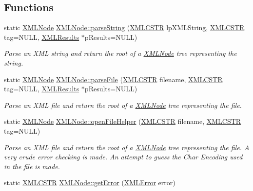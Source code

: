 \subsection*{Functions}
\begin{DoxyCompactItemize}
\item 
static \hyperlink{structXMLNode}{X\-M\-L\-Node} \hyperlink{group__conversions_ga72125a4ccfae9b39bafab768346bbc7e}{X\-M\-L\-Node\-::parse\-String} (\hyperlink{xmlParser_8h_acdb0d6fd8dd596384b438d86cfb2b182}{X\-M\-L\-C\-S\-T\-R} lp\-X\-M\-L\-String, \hyperlink{xmlParser_8h_acdb0d6fd8dd596384b438d86cfb2b182}{X\-M\-L\-C\-S\-T\-R} tag=N\-U\-L\-L, \hyperlink{structXMLResults}{X\-M\-L\-Results} $\ast$p\-Results=N\-U\-L\-L)
\begin{DoxyCompactList}\small\item\em Parse an X\-M\-L string and return the root of a \hyperlink{structXMLNode}{X\-M\-L\-Node} tree representing the string. \end{DoxyCompactList}\item 
static \hyperlink{structXMLNode}{X\-M\-L\-Node} \hyperlink{group__conversions_gae984d7ebce97fad429b2b786439815fb}{X\-M\-L\-Node\-::parse\-File} (\hyperlink{xmlParser_8h_acdb0d6fd8dd596384b438d86cfb2b182}{X\-M\-L\-C\-S\-T\-R} filename, \hyperlink{xmlParser_8h_acdb0d6fd8dd596384b438d86cfb2b182}{X\-M\-L\-C\-S\-T\-R} tag=N\-U\-L\-L, \hyperlink{structXMLResults}{X\-M\-L\-Results} $\ast$p\-Results=N\-U\-L\-L)
\begin{DoxyCompactList}\small\item\em Parse an X\-M\-L file and return the root of a \hyperlink{structXMLNode}{X\-M\-L\-Node} tree representing the file. \end{DoxyCompactList}\item 
static \hyperlink{structXMLNode}{X\-M\-L\-Node} \hyperlink{group__conversions_ga46f99cf406604471e15d4378f74ecc63}{X\-M\-L\-Node\-::open\-File\-Helper} (\hyperlink{xmlParser_8h_acdb0d6fd8dd596384b438d86cfb2b182}{X\-M\-L\-C\-S\-T\-R} filename, \hyperlink{xmlParser_8h_acdb0d6fd8dd596384b438d86cfb2b182}{X\-M\-L\-C\-S\-T\-R} tag=N\-U\-L\-L)
\begin{DoxyCompactList}\small\item\em Parse an X\-M\-L file and return the root of a \hyperlink{structXMLNode}{X\-M\-L\-Node} tree representing the file. A very crude error checking is made. An attempt to guess the Char Encoding used in the file is made. \end{DoxyCompactList}\item 
static \hyperlink{xmlParser_8h_acdb0d6fd8dd596384b438d86cfb2b182}{X\-M\-L\-C\-S\-T\-R} \hyperlink{group__conversions_ga615a6ca792929132043d1de511023772}{X\-M\-L\-Node\-::get\-Error} (\hyperlink{xmlParser_8h_ac39bd07b1461aaa70afffe2d7162b4f5}{X\-M\-L\-Error} error)

\end{DoxyCompactItemize}
